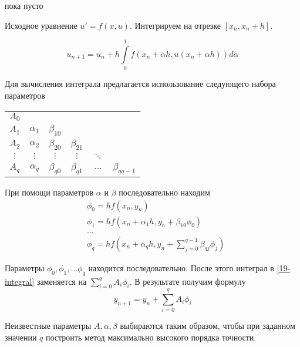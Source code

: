 \begin{col-answer-preambule}
	\begin{plan}
    \item пока пусто
	\end{plan}
\end{col-answer-preambule}


Исходное уравнение $u' = f(x, u)$. Интегрируем на отрезке $[x_n, x_n + h]$.

\begin{equation}
  \label{19-integral}
  u_{n + 1} = u_n + h\int\limits_0^1f(x_n + \alpha h, u(x_n + \alpha h))d\alpha
\end{equation}

Для вычисления интеграла предлагается использование следующего набора параметров

\begin{tabular}{c|c|c c c c}
  $A_0$ & & & & & \\
  $A_1$ & $\alpha_1$ & $\beta_{10}$ & & & \\
  $A_2$ & $\alpha_2$ & $\beta_{20}$ & $\beta_{21}$ & & \\
  $\vdots$ & $\vdots$ & $\vdots$ & $\vdots$ & $\ddots$ & \\
  $A_q$ & $\alpha_q$ & $\beta_{q0}$ & $\beta_{q1}$ & $\ldots$ & $\beta_{qq-1}$
\end{tabular}

При помощи параметров $\alpha$ и $\beta$ последовательно находим
\begin{equation}
  \label{19-alpha-beta}
  \begin{split}
    &\phi_0 = h f(x_n, y_n)\\
    &\phi_1 = h f(x_n + \alpha_1 h, y_n + \beta_{10}\phi_0)\\
    &\ldots\\
    &\phi_q = h f(x_n + \alpha_q h, y_n + \sum\limits_{j = 0}^{q - 1}
    \beta_{qj}\phi_j)
  \end{split}
\end{equation}

Параметры $\phi_0, \phi_1, \ldots \phi_q$ находится последовательно. После этого
интеграл в \eqref{19-integral} заменяется на $\sum\limits_{i = 0}^qA_i\phi_i$.
В результате получим формулу
\begin{equation}
  \label{19-int-approx}
  y_{n + 1} = y_n + \sum\limits_{i = 0}^qA_i\phi_i
\end{equation}

Неизвестные параметры $A, \alpha, \beta$ выбираются таким образом, чтобы при
заданном значении $q$ построить метод максимально высокого порядка точности.

